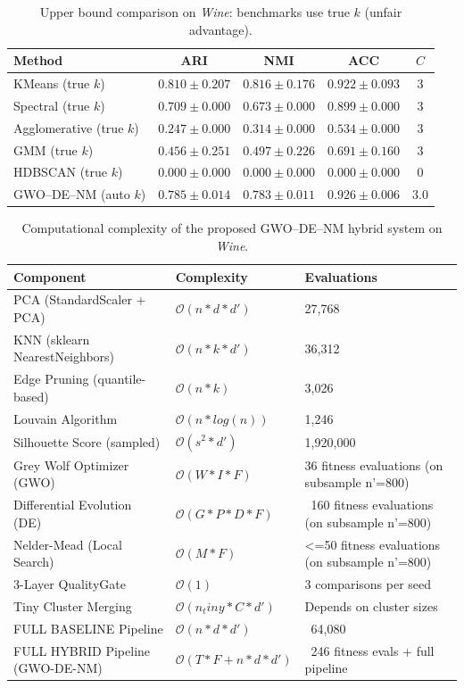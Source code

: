 \begin{table}[htbp]
\centering\small
\caption{Upper bound comparison on \textit{Wine}: benchmarks use true $k$ (unfair advantage).}
\label{tab:upper_wine}
\begin{tabular}{lcccc}
\toprule
Method & ARI & NMI & ACC & $C$ \\
\midrule
KMeans (true $k$) & $0.810 \pm 0.207$ & $0.816 \pm 0.176$ & $0.922 \pm 0.093$ & $3$ \\
Spectral (true $k$) & $0.709 \pm 0.000$ & $0.673 \pm 0.000$ & $0.899 \pm 0.000$ & $3$ \\
Agglomerative (true $k$) & $0.247 \pm 0.000$ & $0.314 \pm 0.000$ & $0.534 \pm 0.000$ & $3$ \\
GMM (true $k$) & $0.456 \pm 0.251$ & $0.497 \pm 0.226$ & $0.691 \pm 0.160$ & $3$ \\
HDBSCAN (true $k$) & $0.000 \pm 0.000$ & $0.000 \pm 0.000$ & $0.000 \pm 0.000$ & $0$ \\
\midrule
GWO--DE--NM (auto $k$) & $\mathbf{0.785 \pm 0.014}$ & $\mathbf{0.783 \pm 0.011}$ & $\mathbf{0.926 \pm 0.006}$ & $3.0$ \\
\bottomrule
\end{tabular}
\end{table}

\begin{table}[htbp]
\centering
\small
\caption{Computational complexity of the proposed GWO--DE--NM hybrid system on \textit{Wine}.}
\label{tab:complexity_wine}
\begin{tabular}{lll}
\toprule
Component & Complexity & Evaluations \\
\midrule
PCA (StandardScaler + PCA) & $\mathcal{O}(n * d * d')$ & 27,768 \\
KNN (sklearn NearestNeighbors) & $\mathcal{O}(n * k * d')$ & 36,312 \\
Edge Pruning (quantile-based) & $\mathcal{O}(n * k)$ & 3,026 \\
Louvain Algorithm & $\mathcal{O}(n * log(n))$ & 1,246 \\
Silhouette Score (sampled) & $\mathcal{O}(s^2 * d')$ & 1,920,000 \\
Grey Wolf Optimizer (GWO) & $\mathcal{O}(W * I * F)$ & 36 fitness evaluations (on subsample n'=800) \\
Differential Evolution (DE) & $\mathcal{O}(G * P * D * F)$ & ~160 fitness evaluations (on subsample n'=800) \\
Nelder-Mead (Local Search) & $\mathcal{O}(M * F)$ & <=50 fitness evaluations (on subsample n'=800) \\
3-Layer QualityGate & $\mathcal{O}(1)$ & 3 comparisons per seed \\
Tiny Cluster Merging & $\mathcal{O}(n_tiny * C * d')$ & Depends on cluster sizes \\
\midrule
FULL BASELINE Pipeline & $\mathcal{O}(n * d * d')$ & ~64,080 \\
\midrule
FULL HYBRID Pipeline (GWO-DE-NM) & $\mathcal{O}(T * F + n * d * d')$ & ~246 fitness evals + full pipeline \\
\bottomrule
\end{tabular}
\end{table}